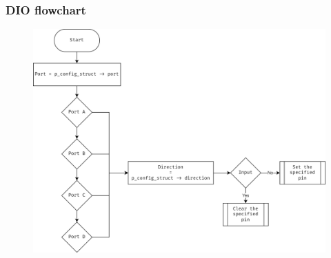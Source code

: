 \documentclass[10pt]{article}
\begin{document}
\subsubsection{DIO flowchart}
\begin{figure}[H]
	\includegraphics[width=14cm]{dio_flowchart}
	\centering
\end{figure}
\end{document}
